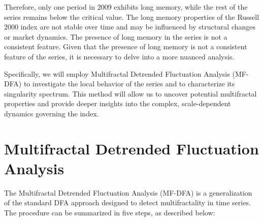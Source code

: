 \documentclass[11pt]{extarticle}
\begin{document}
\FloatBarrier

Therefore, only one period in 2009 exhibits long memory, while the rest of the series remains below the critical value.
The long memory properties of the Russell 2000 index are not stable over time and may be influenced by
structural changes or market dynamics. The presence of long memory in the series is not a consistent feature.
Given that the presence of long memory is not a consistent feature of the series, it is necessary to delve into a more
nuanced analysis.


Specifically, we will employ Multifractal Detrended Fluctuation Analysis (MF-DFA) to investigate the local behavior of
the series and to characterize its singularity spectrum. This method will allow us to uncover potential multifractal
properties and provide deeper insights into the complex, scale-dependent dynamics governing the index.




\section{Multifractal Detrended Fluctuation Analysis}

The Multifractal Detrended Fluctuation Analysis (MF-DFA) is a generalization of the standard DFA approach designed to detect multifractality in time series. The procedure can be summarized in five steps, as described below:
\end{document}
